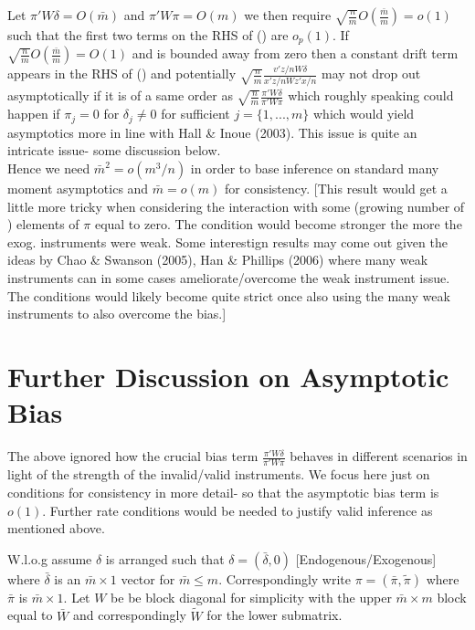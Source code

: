 \documentclass[11pt, fleqn]{article}
\begin{document}
Let $\pi'W\delta=O(\bar{m})$ and $\pi'W\pi=O(m)$ we then require $ \sqrt{\frac{n}{m}} O(\frac{\bar{m}}{m})=o(1)$ such that the first two terms on the RHS of (\label{limit}) are $o_p(1)$. If $\sqrt{\frac{n}{m}} O(\frac{\bar{m}}{m})=O(1)$ and is bounded away from zero then a constant drift term appears in the RHS of (\label{limit}) and potentially $\sqrt{\frac{n}{m}} \frac{v'z/nW\delta}{x'z/nWz'x/n}$ may not drop out asymptotically if it is of a same order as $\sqrt{\frac{n}{m}} \frac{\pi'W\delta}{\pi'W\pi}$ which roughly speaking could happen if $\pi_j=0$ for $\delta_j\neq 0$ for sufficient $j=\{1,...,m\}$ which would yield asymptotics more in line with  Hall \& Inoue (2003). This issue is quite an intricate issue- some discussion below.\\

Hence we need $\bar{m}^2=o(m^3/n)$ in order to base inference on standard many moment asymptotics and $\bar{m}=o(m)$ for consistency. [This result would get a little more tricky when considering the interaction with some (growing number of ) elements of $\pi$  equal to zero. The condition would become stronger the more the exog. instruments were weak. Some interestign results may come out given the ideas by Chao \& Swanson (2005), Han \& Phillips (2006) where many weak instruments can in some cases ameliorate/overcome the weak instrument issue. The conditions would likely become quite strict once also using the many weak instruments to also overcome the bias.]\\

\section{Further Discussion on Asymptotic Bias}
The above ignored how the crucial bias term $\frac{\pi'W\delta}{\pi'W\pi}$ behaves in different scenarios in light of the strength of the invalid/valid instruments. We focus here just on conditions for consistency in more detail- so that the asymptotic bias term is $o(1)$. Further rate conditions would be needed to justify valid inference as mentioned above.

W.l.o.g assume $\delta$ is arranged such that $\delta=(\bar{\delta},0)$ [Endogenous/Exogenous] where $\bar{\delta}$ is an $\bar{m}\times 1$ vector for $\bar{m}\leq m$.  Correspondingly write $\pi=(\bar{\pi},\tilde{\pi})$ where $\bar{\pi}$ is $\bar{m}\times 1$.
 Let $W$ be be block diagonal for simplicity with the upper $\bar{m}\times m$ block equal to $\bar{W}$ and correspondingly $\tilde{W}$ for the lower submatrix.
\end{document}
